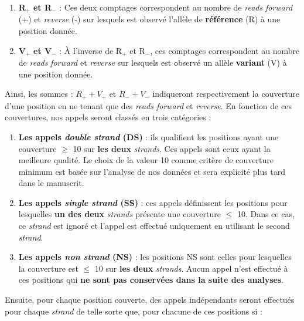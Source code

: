 \documentclass[12pt,a4paper,twoside]{ugathesis}
\providecommand{\tightlist}{%
  \setlength{\itemsep}{0pt}\setlength{\parskip}{0pt}}
\begin{document}
\begin{enumerate}
\def\labelenumi{\arabic{enumi}.}
\tightlist
\item
  \textbf{R}\(_+\) \textbf{et R}\(_-\) : Ces deux comptages
  correspondent au nombre de \emph{reads} \emph{forward} (+) et
  \emph{reverse} (-) sur lesquels est observé l'allèle de
  \textbf{référence} (R) à une position donnée.\\
\item
  \textbf{V}\(_+\) \textbf{et V}\(_-\) : À l'inverse de R\(_+\) et
  R\(_-\), ces comptages correspondent au nombre de \emph{reads}
  \emph{forward} et \emph{reverse} sur lesquels est observé un allèle
  \textbf{variant} (V) à une position donnée.
\end{enumerate}

Ainsi, les sommes : \(R_+ + V_+\) et \(R_- + V_-\) indiqueront
respectivement la couverture d'une position en ne tenant que des
\emph{reads forward} et \emph{reverse}. En fonction de ces couvertures,
nos appels seront classés en trois catégories :

\begin{enumerate}
\def\labelenumi{\arabic{enumi}.}
\item
  \textbf{Les appels \emph{double strand} (DS)} : ils qualifient les
  positions ayant une couverture \(\ge\) 10 sur \textbf{les deux}
  \emph{strands}. Ces appels sont ceux ayant la meilleure qualité. Le
  choix de la valeur 10 comme critère de couverture minimum est basée
  sur l'analyse de nos données et sera explicité plus tard dans le
  manuscrit.
\item
  \textbf{Les appels \emph{single strand} (SS)} : ces appels définissent
  les positions pour lesquelles \textbf{un des deux} \emph{strands}
  présente une couverture \(\le\) 10. Dans ce cas, ce \emph{strand} est
  ignoré et l'appel est effectué uniquement en utilisant le second
  \emph{strand}.
\item
  \textbf{Les appels \emph{non strand} (NS)} : les positions NS sont
  celles pour lesquelles la couverture est \(\le\) 10 sur \textbf{les
  deux} \emph{strands}. Aucun appel n'est effectué à ces positions qui
  \textbf{ne sont pas conservées dans la suite des analyses}.
\end{enumerate}

Ensuite, pour chaque position couverte, des appels indépendants seront
effectués pour chaque \emph{strand} de telle sorte que, pour chacune de
ces positions si :
\end{document}
